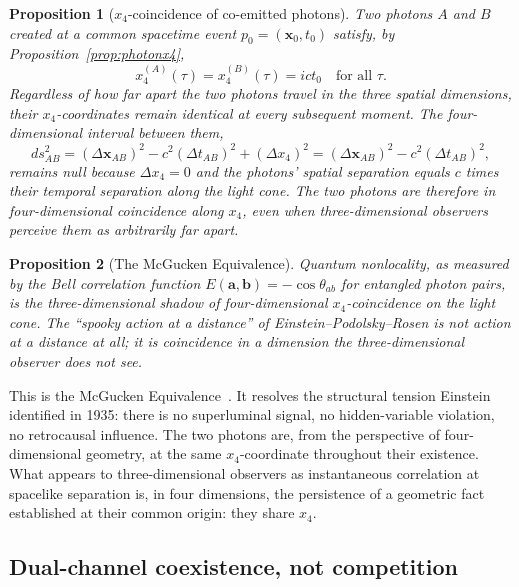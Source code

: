 \documentclass[11pt,a4paper]{article}
\newtheorem{proposition}{Proposition}
\begin{document}
\begin{proposition}[$x_4$-coincidence of co-emitted photons]
\label{prop:coincidence}
Two photons $A$ and $B$ created at a common spacetime event $p_0 = (\mathbf{x}_0, t_0)$ satisfy, by Proposition~\ref{prop:photonx4},
\begin{equation}
x_4^{(A)}(\tau) = x_4^{(B)}(\tau) = ict_0 \quad \text{for all } \tau.
\end{equation}
Regardless of how far apart the two photons travel in the three spatial dimensions, their $x_4$-coordinates remain identical at every subsequent moment. The four-dimensional interval between them,
\begin{equation}
ds_{AB}^2 = (\Delta \mathbf{x}_{AB})^2 - c^2 (\Delta t_{AB})^2 + (\Delta x_4)^2 = (\Delta \mathbf{x}_{AB})^2 - c^2 (\Delta t_{AB})^2,
\end{equation}
remains null because $\Delta x_4 = 0$ and the photons' spatial separation equals $c$ times their temporal separation along the light cone. The two photons are therefore in four-dimensional coincidence along $x_4$, even when three-dimensional observers perceive them as arbitrarily far apart.
\end{proposition}

\begin{proposition}[The McGucken Equivalence]
\label{prop:McGEquiv}
Quantum nonlocality, as measured by the Bell correlation function $E(\mathbf{a}, \mathbf{b}) = -\cos\theta_{ab}$ for entangled photon pairs, is the three-dimensional shadow of four-dimensional $x_4$-coincidence on the light cone. The ``spooky action at a distance'' of Einstein--Podolsky--Rosen is not action at a distance at all; it is coincidence in a dimension the three-dimensional observer does not see.
\end{proposition}

This is the McGucken Equivalence~\cite{mcguckennonloc}. It resolves the structural tension Einstein identified in 1935: there is no superluminal signal, no hidden-variable violation, no retrocausal influence. The two photons are, from the perspective of four-dimensional geometry, at the same $x_4$-coordinate throughout their existence. What appears to three-dimensional observers as instantaneous correlation at spacelike separation is, in four dimensions, the persistence of a geometric fact established at their common origin: they share $x_4$.

\subsection{Dual-channel coexistence, not competition}
\end{document}
